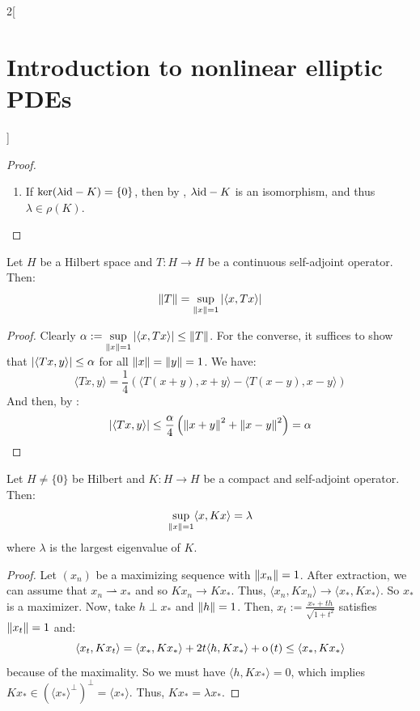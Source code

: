 \documentclass[../../../main_math.tex]{subfiles}
\begin{document}
\begin{multicols}{2}[\section{Introduction to nonlinear elliptic PDEs}]
\begin{proof}
\begin{enumerate}
      \item If $\ker(\lambda\mathrm{id}-K)=\{0\}$, then by , $\lambda\mathrm{id}-K$ is an isomorphism, and thus $\lambda\in \rho(K)$.
            \setcounter{enumi}{3}
    \end{enumerate}
  \end{proof}
  \begin{lemma}
    Let $H$ be a Hilbert space and $T:H\to H$ be a continuous self-adjoint operator. Then:
    $$
      \left\|T\right\|=\sup_{\left\|x\right\|=1}\abs{\langle x,Tx\rangle}
    $$
  \end{lemma}
  \begin{proof}
    Clearly $\displaystyle\alpha:=\sup_{\left\|x\right\|=1}\abs{\langle x,Tx\rangle}\leq \left\|T\right\|$. For the converse, it suffices to show that $\abs{\langle Tx,y\rangle}\leq \alpha$ for all $\left\|x\right\|=\left\|y\right\|=1$. We have:
    $$
      \langle Tx,y\rangle = \frac{1}{4}\left(\langle T(x+y),x+y\rangle-\langle T(x-y),x-y\rangle\right)
    $$
    And then, by :
    $$
      \abs{\langle Tx,y\rangle}\leq \frac{\alpha}{4}\left(\left\|x+y\right\|^2+\left\|x-y\right\|^2\right)= \alpha
    $$
  \end{proof}
  \begin{lemma}
    Let $H\ne\{ 0\}$ be Hilbert and $K:H\to H$ be a compact and self-adjoint operator. Then:
    $$
      \sup_{\left\|x\right\|=1}\langle x,Kx\rangle=\lambda
    $$
    where $\lambda$ is the largest eigenvalue of $K$.
  \end{lemma}
  \begin{proof}
    Let $(x_n)$ be a maximizing sequence with $\left\|x_n\right\|=1$. After extraction, we can assume that $x_n\rightharpoonup x_*$ and so $Kx_n\to Kx_*$. Thus, $\langle x_n,Kx_n\rangle\to \langle x_*,Kx_*\rangle$. So $x_*$ is a maximizer. Now, take $h\perp x_*$ and $\left\|h\right\|=1$. Then, $x_t:=\frac{x_*+th}{\sqrt{1+t^2}}$ satisfies $\left\|x_t\right\|=1$ and:
    $$
      \langle x_t,Kx_t\rangle=\langle x_*,Kx_*\rangle+2t\langle h,Kx_*\rangle+\mathrm{o}\left(t\right)\leq \langle x_*,Kx_*\rangle
    $$
    because of the maximality. So we must have $\langle h,Kx_*\rangle=0$, which implies $Kx_*\in {{({\langle x_*\rangle}^\perp)}^\perp}=\langle x_*\rangle$. Thus, $Kx_*=\lambda x_*$.
  \end{proof}

\end{multicols}
\end{document}
